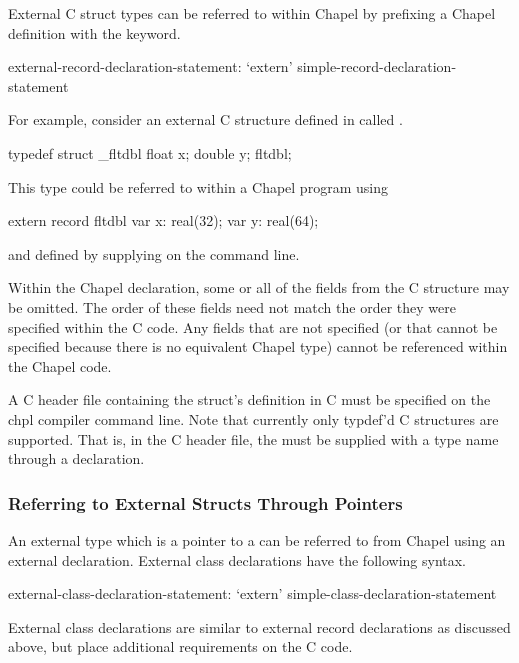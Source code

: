 External C struct types can be referred to within Chapel by prefixing
a Chapel  definition with the  keyword.
\begin{syntax}
external-record-declaration-statement:
  `extern' simple-record-declaration-statement
\end{syntax}

For example, consider an external C structure defined in  called .
\begin{chapel}
    typedef struct _fltdbl {
      float x;
      double y;
    } fltdbl;
\end{chapel}
This type could be referred to within a Chapel program using
\begin{chapel}
   extern record fltdbl {
     var x: real(32);
     var y: real(64);
   }
\end{chapel}
\noindent
and defined by supplying  on the  command line.

Within the Chapel declaration, some or all of the fields from the C
structure may be omitted.  The order of these fields need not match
the order they were specified within the C code.  Any fields that are
not specified (or that cannot be specified because there is no
equivalent Chapel type) cannot be referenced within the Chapel code.

A C header file containing the struct's definition in C must be specified on the
chpl compiler command line.  Note that currently only typdef'd C structures are
supported.  That is, in the C header file, the  must be supplied
with a type name through a  declaration.

\subsubsection{Referring to External Structs Through Pointers}
\label{Referring_to_External_Structs_Through_Pointers}

An external type which is a pointer to a  can be referred to from
Chapel using an external  declaration.  External class declarations
have the following syntax.
\begin{syntax}
external-class-declaration-statement:
  `extern' simple-class-declaration-statement
\end{syntax}
External class declarations are similar to external record declarations as
discussed above, but place additional requirements on the C code.


